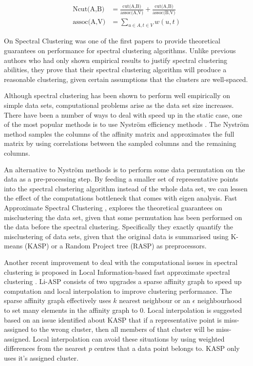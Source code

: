 \documentclass[12pt]{report}		%
\begin{document}
\begin{eqnarray}
  \text{Ncut(A,B)} &= \frac{\text{cut(A,B)}}{\text{assoc(A,V)}} + \frac{\text{cut(A,B)}}{\text{assoc(B,V)}} \\
  \text{assoc(A,V)} &= \sum_{u \in A, t \in V}w(u, t) \nonumber
  \label{eq:ncut}
\end{eqnarray}

On Spectral Clustering \cite{Ng2001} was one of the first papers to provide theoretical guarantees on performance for spectral clustering algorithms.  Unlike previous authors who had only shown empirical results to justify spectral clustering abilities, they prove that their spectral clustering algorithm will produce a reasonable clustering, given certain assumptions that the clusters are well-spaced. %

Although spectral clustering has been shown to perform well empirically on simple data sets, computational problems arise as the data set size increases. There have been a number of ways to deal with speed up in the static case, one of the most popular methods is to use Nystr\"{o}m efficiency methods \cite{Williams2001} \cite{Fowlkes2004}. The Nystr\"{o}m method samples the columns of the affinity matrix and approximates the full matrix by using correlations between the sampled columns and the remaining columns. 

An alternative to Nystr\"{o}m methods is to perform some data permutation on the data as a pre-processing step. By feeding a smaller set of representative points into the spectral clustering algorithm instead of the whole data set, we can lessen the effect of the computations bottleneck that comes with eigen analysis. Fast Approximate Spectral Clustering \cite{Yan2009}, \cite{Huang2009} explores the theoretical guarantees on misclustering the data set, given that some permutation has been performed on the data before the spectral clustering. Specifically they exactly quantify the misclustering of data sets, given that the original data is summarised using K-means (KASP) or a Random Project tree (RASP) as preprocessors. 

Another recent improvement to deal with the computational issues in spectral clustering is proposed in Local Information-based fast approximate spectral clustering \cite{Cao2014}. Li-ASP consists of two upgrades a sparse affinity graph to speed up computation and local interpolation to improve clustering performance. The sparse affinity graph effectively uses $k$ nearest neighbour or an $\epsilon$ neighbourhood to set many elements in the affinity graph to 0. Local interpolation is suggested based on an issue identified about KASP \cite{Yan2009} that if a representative point is miss-assigned to the wrong cluster, then all members of that cluster will be miss-assigned. Local interpolation can avoid these situations by using weighted differences from the nearest $p$ centres that a data point belongs to. KASP only uses it's assigned cluster. 
\end{document}
